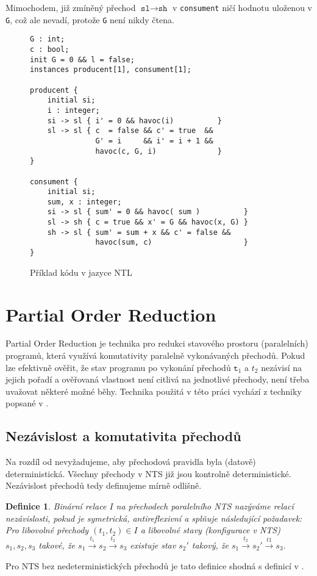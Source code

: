 \documentclass[10pt,a4paper,notitlepage]{report}
\newtheorem{definition}{Definice}
\begin{document}
Mimochodem, již zmíněný přechod $\texttt{sl} \rightarrow \texttt{sh}$ v \texttt{consument} ničí hodnotu uloženou v \texttt{G}, což ale nevadí, protože \texttt{G} není nikdy čtena.

\begin{figure}[h!]
\begin{lstlisting}
G : int;
c : bool;
init G = 0 && l = false;
instances producent[1], consument[1];

producent {
    initial si;
    i : integer;
    si -> sl { i' = 0 && havoc(i)          }
    sl -> sl { c  = false && c' = true  &&
               G' = i     && i' = i + 1 &&
               havoc(c, G, i)              }
}

consument {
	initial si;
	sum, x : integer;
	si -> sl { sum' = 0 && havoc( sum )          }
	sl -> sh { c = true && x' = G && havoc(x, G) }
	sh -> sl { sum' = sum + x && c' = false &&
	           havoc(sum, c)                     }
}

\end{lstlisting}
\caption{Příklad kódu v jazyce NTL}
\label{fig:nts-prodcons}
\end{figure}

\section{Partial Order Reduction}
Partial Order Reduction je technika pro redukci stavového prostoru (paralelních) programů, která využívá komutativity paralelně vykonávaných přechodů. Pokud lze efektivně ověřit, že stav programu po vykonání přechodů $\texttt{t}_1$ a $t_2$ nezávisí na jejich pořadí a ověřovaná vlastnost není citlivá na jednotlivé přechody, není třeba uvažovat některé možné běhy. Technika použitá v této práci vychází z techniky popsané v \cite{CLARKE}.

\subsection{Nezávislost a komutativita přechodů}
Na rozdíl od \cite{CLARKE} nevyžadujeme, aby přechodová pravidla byla (datově) deterministická. Všechny přechody v NTS již jsou kontrolně deterministické. Nezávislost přechodů tedy definujeme mírně odlišně.
\begin{definition}
Binární relace $I$ na přechodech paralelního NTS nazýváme relací nezávislosti, pokud je symetrická, antireflexivní a splňuje následující požadavek:
Pro libovolné přechody $(t_1, t_2) \in I$ a libovolné stavy (konfigurace v NTS) $s_1, s_2, s_3$ takové, že  $s_1 \xrightarrow{t_1} s_2 \xrightarrow{t_2} s_3$ existuje stav $s_2'$ takový, že $s_1 \xrightarrow{t_2} s_2' \xrightarrow{t1} s_3$.
\end{definition}
Pro NTS bez nedeterministických přechodů je tato definice shodná s definicí v \cite{CLARKE}.
\end{document}
